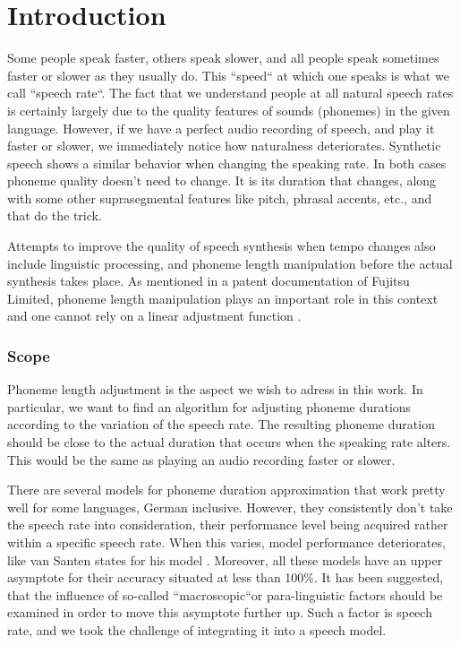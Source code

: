 \documentclass[11pt,a4paper]{scrbook}
\begin{document}
\tableofcontents

\chapter{Introduction}
Some people speak faster, others speak slower, and all people speak sometimes faster or slower as they usually do. This ``speed`` at which one speaks is what we call ``speech rate``. The fact that we understand people at all natural speech rates is certainly largely due to the quality features of sounds (phonemes) in the given language. However, if we have a perfect audio recording of speech, and play it faster or slower, we immediately notice how naturalness deteriorates. Synthetic speech shows a similar behavior when changing the speaking rate. In both cases phoneme quality doesn't need to change. It is its duration that changes, along with some other suprasegmental features like pitch, phrasal accents, etc., and that do the trick. 

Attempts to improve the quality of speech synthesis when tempo changes also include linguistic processing, and phoneme length manipulation before the actual synthesis takes place. As mentioned in a patent documentation of Fujitsu Limited, phoneme length manipulation plays an important role in this context and one cannot rely on a linear adjustment function \cite{nishiike2008}. 

\subsection*{Scope}
Phoneme length adjustment is the aspect we wish to adress in this work. In particular, we want to find an algorithm for adjusting phoneme durations according to the variation of the speech rate. The resulting phoneme duration should be close to the actual duration that occurs when the speaking rate alters. This would be the same as playing an audio recording faster or slower. 

There are several models for phoneme duration approximation that work pretty well for some languages, German inclusive. However, they consistently don't take the speech rate into consideration, their performance level being acquired rather within a specific speech rate. When this varies, model performance deteriorates, like van Santen states for his model \cite{Santen1994}. Moreover, all these models have an upper asymptote for their accuracy situated at less than 100\%. It has been suggested, that the influence of so-called ``macroscopic``or para-linguistic \cite{Santen1994} factors should be examined in order to move this asymptote further up. Such a factor is speech rate, and we took the challenge of integrating it into a speech model. 
\end{document}
